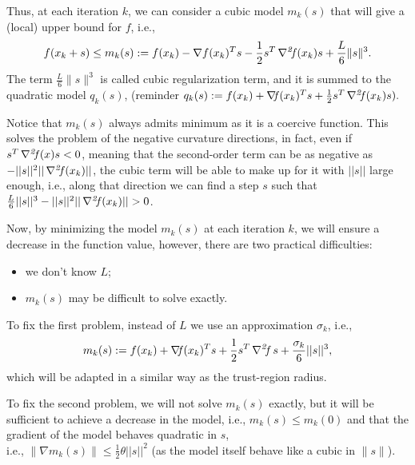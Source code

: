 \documentclass[10pt,a4paper]{article}
\begin{document}
Thus, at each iteration $k$, we can consider a cubic model $m_k(s)$ that will give a (local) upper bound for $f$, i.e., 
$$ f(x_k+s) \leq m_k(s):= f(x_k) - \nabla f(x_k)^T s - \frac{1}{2}s^T \operatorname*{\mathit{\nabla^2 \!f}}(x_k)s + \frac{L}{6}\|s\|^3.$$
The term $\frac{L}{6}\|s\|^3$ is called cubic regularization term, and it is summed to the quadratic model $q_k(s)$, (reminder $q_k(s) := f(x_k)+ \operatorname*{\mathit{\nabla \!f}}(x_k)^Ts + \frac{1}{2}s^T\operatorname*{\mathit{\nabla^2 \!f}}(x_k) s).$
\begin{remark}
	Notice that $m_k(s)$ always admits minimum as it is a coercive function. This solves the problem of the negative curvature directions, in fact, even if $s^T \operatorname*{\mathit{\nabla^2 \!f}}(x)s<0$, meaning that the second-order term can be as negative as $-||s||^2 ||\operatorname*{\mathit{\nabla^2 \!f}}(x_k)||$, the cubic term will be able to make up for it with $||s||$ large enough, i.e., along that direction we can find a step $s$ such that $\frac{L}{6} ||s||^3 -||s||^2 ||\hess(x_k)||>0$.
\end{remark}
Now, by minimizing the model $m_k(s)$ at each iteration $k$, we will ensure a decrease in the function value, however, there are two practical difficulties:
\begin{itemize}
	\item we don't know $L$;
	\item $m_k(s)$ may be difficult to solve exactly.
\end{itemize}
To fix the first problem, instead of $L$ we use an approximation $\sigma_k$, i.e., 
\begin{equation}\label{eq:cubic_reg_model}
	m_k(s) := f(x_k)+ \operatorname*{\mathit{\nabla \!f}}(x_k)^Ts + \frac{1}{2}s^T\operatorname*{\mathit{\nabla^2 \!f}} s + \frac{\sigma_k}{6} ||s||^3,
\end{equation}
which will be adapted in a similar way as the trust-region radius. 
\par To fix the second problem, we will not solve $m_k(s)$ exactly, but it will be sufficient to achieve a decrease in the model, i.e., $m_k(s)\leq m_k(0)$ and that the gradient of the model behaves quadratic in $s$, \\i.e., $\|\nabla m_k(s)\|\leq \frac{1}{2}\theta ||s||^2$ (as the model itself behave like a cubic in $\|s\|$).
\end{document}
